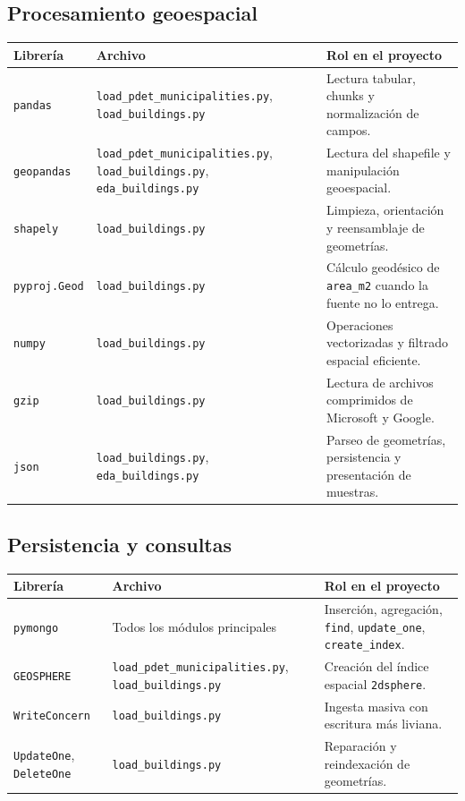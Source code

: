 \documentclass[12pt,a4paper]{article}
\begin{document}
\subsection{Procesamiento geoespacial}

\begin{longtable}{|p{4cm}|p{4cm}|p{5cm}|}
\hline
\textbf{Librer\'ia} & \textbf{Archivo} & \textbf{Rol en el proyecto} \\\hline
\texttt{pandas} & \texttt{load\_pdet\_municipalities.py}, \texttt{load\_buildings.py} & Lectura tabular, chunks y normalizaci\'on de campos. \\\hline
\texttt{geopandas} & \texttt{load\_pdet\_municipalities.py}, \texttt{load\_buildings.py}, \texttt{eda\_buildings.py} & Lectura del shapefile y manipulación geoespacial. \\\hline
\texttt{shapely} & \texttt{load\_buildings.py} & Limpieza, orientaci\'on y reensamblaje de geometr\'ias. \\\hline
\texttt{pyproj.Geod} & \texttt{load\_buildings.py} & C\'alculo geod\'esico de \texttt{area\_m2} cuando la fuente no lo entrega. \\\hline
\texttt{numpy} & \texttt{load\_buildings.py} & Operaciones vectorizadas y filtrado espacial eficiente. \\\hline
\texttt{gzip} & \texttt{load\_buildings.py} & Lectura de archivos comprimidos de Microsoft y Google. \\\hline
\texttt{json} & \texttt{load\_buildings.py}, \texttt{eda\_buildings.py} & Parseo de geometr\'ias, persistencia y presentaci\'on de muestras. \\\hline
\end{longtable}

\subsection{Persistencia y consultas}

\begin{longtable}{|p{4cm}|p{4cm}|p{5cm}|}
\hline
\textbf{Librer\'ia} & \textbf{Archivo} & \textbf{Rol en el proyecto} \\\hline
\texttt{pymongo} & Todos los m\'odulos principales & Inserci\'on, agregaci\'on, \texttt{find}, \texttt{update\_one}, \texttt{create\_index}. \\\hline
\texttt{GEOSPHERE} & \texttt{load\_pdet\_municipalities.py}, \texttt{load\_buildings.py} & Creaci\'on del \'indice espacial \texttt{2dsphere}. \\\hline
\texttt{WriteConcern} & \texttt{load\_buildings.py} & Ingesta masiva con escritura m\'as liviana. \\\hline
\texttt{UpdateOne}, \texttt{DeleteOne} & \texttt{load\_buildings.py} & Reparaci\'on y reindexaci\'on de geometr\'ias. \\\hline
\end{longtable}
\end{document}
